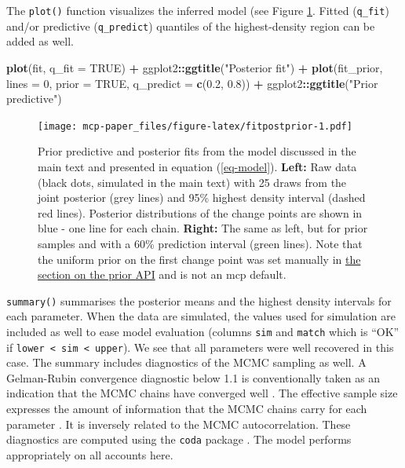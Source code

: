 \documentclass[
  american,
]{article}
\newenvironment{Shaded}{\begin{snugshade}}{\end{snugshade}}
\newcommand{\DataTypeTok}[1]{\textcolor[rgb]{0.13,0.29,0.53}{#1}}
\newcommand{\DecValTok}[1]{\textcolor[rgb]{0.00,0.00,0.81}{#1}}
\newcommand{\FloatTok}[1]{\textcolor[rgb]{0.00,0.00,0.81}{#1}}
\newcommand{\KeywordTok}[1]{\textcolor[rgb]{0.13,0.29,0.53}{\textbf{#1}}}
\newcommand{\NormalTok}[1]{#1}
\newcommand{\OperatorTok}[1]{\textcolor[rgb]{0.81,0.36,0.00}{\textbf{#1}}}
\newcommand{\OtherTok}[1]{\textcolor[rgb]{0.56,0.35,0.01}{#1}}
\newcommand{\StringTok}[1]{\textcolor[rgb]{0.31,0.60,0.02}{#1}}
\begin{document}
The \texttt{plot()} function visualizes the inferred model (see Figure \ref{fig:fitpostprior}. Fitted (\texttt{q\_fit}) and/or predictive (\texttt{q\_predict}) quantiles of the highest-density region can be added as well.



\begin{Shaded}
\begin{Highlighting}[]
\KeywordTok{plot}\NormalTok{(fit, }\DataTypeTok{q_fit =} \OtherTok{TRUE}\NormalTok{) }\OperatorTok{+}\StringTok{ }
\StringTok{  }\NormalTok{ggplot2}\OperatorTok{::}\KeywordTok{ggtitle}\NormalTok{(}\StringTok{"Posterior fit"}\NormalTok{) }\OperatorTok{+}
\StringTok{  }
\KeywordTok{plot}\NormalTok{(fit_prior, }\DataTypeTok{lines =} \DecValTok{0}\NormalTok{, }\DataTypeTok{prior =} \OtherTok{TRUE}\NormalTok{, }\DataTypeTok{q_predict =} \KeywordTok{c}\NormalTok{(}\FloatTok{0.2}\NormalTok{, }\FloatTok{0.8}\NormalTok{)) }\OperatorTok{+}\StringTok{ }
\StringTok{  }\NormalTok{ggplot2}\OperatorTok{::}\KeywordTok{ggtitle}\NormalTok{(}\StringTok{"Prior predictive"}\NormalTok{)}
\end{Highlighting}
\end{Shaded}

\begin{figure}
\centering
\texttt{[image: mcp-paper\_files/figure-latex/fitpostprior-1.pdf]}
\caption{\label{fig:fitpostprior}Prior predictive and posterior fits from the model discussed in the main text and presented in equation (\ref{eq-model}). \textbf{Left:} Raw data (black dots, simulated in the main text) with 25 draws from the joint posterior (grey lines) and 95\% highest density interval (dashed red lines). Posterior distributions of the change points are shown in blue - one line for each chain. \textbf{Right:} The same as left, but for prior samples and with a 60\% prediction interval (green lines). Note that the uniform prior on the first change point was set manually in \protect\hyperlink{priors_api}{the section on the prior API} and is not an mcp default.}
\end{figure}

\texttt{summary()} summarises the posterior means and the highest density intervals for each parameter. When the data are simulated, the values used for simulation are included as well to ease model evaluation (columns \texttt{sim} and \texttt{match} which is ``OK'' if \texttt{lower\ \textless{}\ sim\ \textless{}\ upper}). We see that all parameters were well recovered in this case. The summary includes diagnostics of the MCMC sampling as well. A Gelman-Rubin convergence diagnostic below 1.1 is conventionally taken as an indication that the MCMC chains have converged well \citep{gelman1992}. The effective sample size expresses the amount of information that the MCMC chains carry for each parameter \citep{martino2017}. It is inversely related to the MCMC autocorrelation. These diagnostics are computed using the \texttt{coda} package \citep{plummer2006}. The model performs appropriately on all accounts here.
\end{document}
